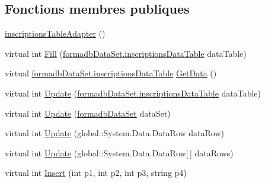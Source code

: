 \subsection*{Fonctions membres publiques}
\begin{DoxyCompactItemize}
\item 
\hyperlink{classforma_1_1formadb_data_set_table_adapters_1_1inscriptions_table_adapter_a09311d4947b07b521106d407feeb3a9e}{inscriptions\+Table\+Adapter} ()
\item 
virtual int \hyperlink{classforma_1_1formadb_data_set_table_adapters_1_1inscriptions_table_adapter_a58ccd9bd614d0f4f20191753ac76c563}{Fill} (\hyperlink{classforma_1_1formadb_data_set_1_1inscriptions_data_table}{formadb\+Data\+Set.\+inscriptions\+Data\+Table} data\+Table)
\item 
virtual \hyperlink{classforma_1_1formadb_data_set_1_1inscriptions_data_table}{formadb\+Data\+Set.\+inscriptions\+Data\+Table} \hyperlink{classforma_1_1formadb_data_set_table_adapters_1_1inscriptions_table_adapter_a73dfbac34010a10218901d0a93187422}{Get\+Data} ()
\item 
virtual int \hyperlink{classforma_1_1formadb_data_set_table_adapters_1_1inscriptions_table_adapter_aa10293bd86b062c3b72fb27697bf9502}{Update} (\hyperlink{classforma_1_1formadb_data_set_1_1inscriptions_data_table}{formadb\+Data\+Set.\+inscriptions\+Data\+Table} data\+Table)
\item 
virtual int \hyperlink{classforma_1_1formadb_data_set_table_adapters_1_1inscriptions_table_adapter_aac055c03cb498e12884662da51f851b3}{Update} (\hyperlink{classforma_1_1formadb_data_set}{formadb\+Data\+Set} data\+Set)
\item 
virtual int \hyperlink{classforma_1_1formadb_data_set_table_adapters_1_1inscriptions_table_adapter_ab2633a5fa82a2ee806bb1d750c813c44}{Update} (global\+::\+System.\+Data.\+Data\+Row data\+Row)
\item 
virtual int \hyperlink{classforma_1_1formadb_data_set_table_adapters_1_1inscriptions_table_adapter_a6cd973218fa5f7667b7b4a7fa0229ba1}{Update} (global\+::\+System.\+Data.\+Data\+Row\mbox{[}$\,$\mbox{]} data\+Rows)
\item 
virtual int \hyperlink{classforma_1_1formadb_data_set_table_adapters_1_1inscriptions_table_adapter_aff88357637cbad963020184791db8ad6}{Insert} (int p1, int p2, int p3, string p4)
\end{DoxyCompactItemize}

